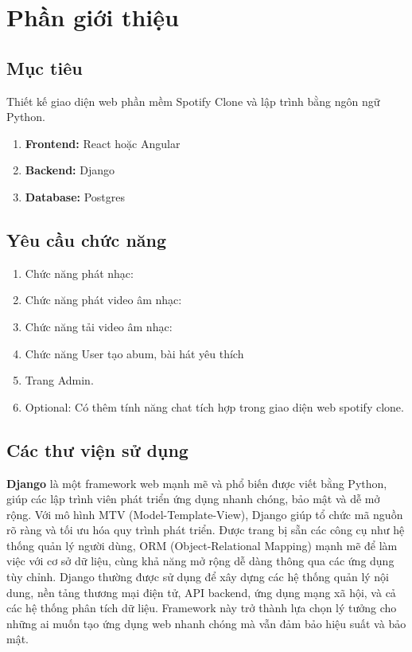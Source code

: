 \documentclass[a4paper]{article}
\begin{document}
\thispagestyle{empty}

\newpage
\tableofcontents
\newpage



\section{Phần giới thiệu}
\subsection{Mục tiêu}
Thiết kế giao diện web phần mềm Spotify Clone và lập trình bằng ngôn ngữ
Python.
\begin{enumerate}
    \item \textbf{Frontend:} React hoặc Angular
    \item \textbf{Backend:} Django
    \item \textbf{Database:} Postgres
\end{enumerate}

\subsection{Yêu cầu chức năng}
\begin{enumerate}
    \item Chức năng phát nhạc:
    \item Chức năng phát video âm nhạc:
    \item Chức năng tải video âm nhạc:
    \item Chức năng User tạo abum, bài hát yêu thích
    \item Trang Admin.
    \item Optional: Có thêm tính năng chat tích hợp trong giao diện web
spotify clone.
\end{enumerate}

\subsection{Các thư viện sử dụng}
\textbf{Django} là một framework web mạnh mẽ và phổ biến được viết bằng Python, giúp các lập trình viên phát triển ứng dụng nhanh chóng, bảo mật và dễ mở rộng. Với mô hình MTV (Model-Template-View), Django giúp tổ chức mã nguồn rõ ràng và tối ưu hóa quy trình phát triển. Được trang bị sẵn các công cụ như hệ thống quản lý người dùng, ORM (Object-Relational Mapping) mạnh mẽ để làm việc với cơ sở dữ liệu, cùng khả năng mở rộng dễ dàng thông qua các ứng dụng tùy chỉnh. Django thường được sử dụng để xây dựng các hệ thống quản lý nội dung, nền tảng thương mại điện tử, API backend, ứng dụng mạng xã hội, và cả các hệ thống phân tích dữ liệu. Framework này trở thành lựa chọn lý tưởng cho những ai muốn tạo ứng dụng web nhanh chóng mà vẫn đảm bảo hiệu suất và bảo mật.
\end{document}
